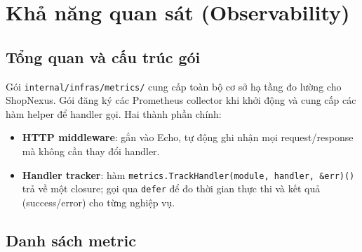 \section{Khả năng quan sát (Observability)}
\label{sec:observability}

\subsection{Tổng quan và cấu trúc gói}

Gói \texttt{internal/infras/metrics/} cung cấp toàn bộ cơ sở hạ tầng đo lường cho ShopNexus. Gói đăng ký các Prometheus collector khi khởi động và cung cấp các hàm helper để handler gọi. Hai thành phần chính:

\begin{itemize}
  \item \textbf{HTTP middleware}: gắn vào Echo, tự động ghi nhận mọi request/response mà không cần thay đổi handler.
  \item \textbf{Handler tracker}: hàm \texttt{metrics.TrackHandler(module, handler, \&err)()} trả về một closure; gọi qua \texttt{defer} để đo thời gian thực thi và kết quả (success/error) cho từng nghiệp vụ.
\end{itemize}

\subsection{Danh sách metric}

